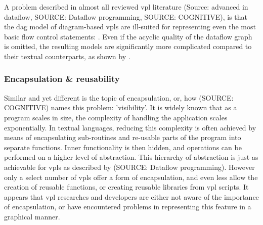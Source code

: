 A problem described in almost all reviewed vpl literature (Source: advanced in dataflow, SOURCE: Dataflow programming,  SOURCE: COGNITIVE), is that the \ac{dag} model of diagram-based vpls are ill-suited for representing even the most basic flow control statements: .
Even if the acyclic quality of the dataflow graph is omitted, the resulting models are significantly more complicated compared to their textual counterparts, as shown by .

\subsubsection*{Encapsulation \& reusability}
Similar and yet different is the topic of encapsulation, or, how (SOURCE: COGNITIVE) names this problem: 'visibility'.
It is widely known that as a program scales in size, the complexity of handling the application scales exponentially.
In textual languages, reducing this complexity is often achieved by means of encapsulating sub-routines and re-usable parts of the program into separate functions.
Inner functionality is then hidden, and operations can be performed on a higher level of abstraction. 
This hierarchy of abstraction is just as achievable for \ac{vpl}s as described by (SOURCE: Dataflow programming).
However only a select number of \ac{vpl}s offer a form of encapsulation, and even less allow the creation of reusable functions, or creating reusable libraries from vpl scripts.
It appears that \ac{vpl} researches and developers are either not aware of the importance of encapsulation, or have encountered problems in representing this feature in a graphical manner.



